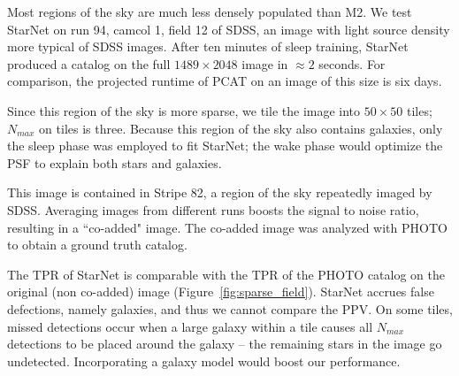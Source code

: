 Most regions of the sky are much less densely populated than M2. 
We test StarNet on run 94, camcol 1, field 12 of SDSS,
an image with light source density more typical of SDSS images.
After ten minutes of sleep training, StarNet produced a catalog on the full $1489\times 2048$ image in $\approx2$ seconds. 
For comparison, the projected runtime of PCAT on an image of this size is six days.  

Since this region of the sky is more sparse, we tile the image into $50\times 50$ tiles; $N_{max}$ on tiles is three. 
Because this region of the sky also contains galaxies, only the sleep phase was employed to fit StarNet; 
the wake phase would optimize the PSF to explain both stars and galaxies. 

This image is contained in Stripe 82, a region of the sky repeatedly imaged by SDSS. Averaging images from different runs boosts the signal to noise ratio, resulting in a ``co-added" image. 
The co-added image was analyzed with PHOTO to obtain a ground truth catalog. 

The TPR of StarNet is comparable with the TPR of the PHOTO catalog on the original (non co-added) image (Figure~\ref{fig:sparse_field}). 
StarNet accrues false defections, namely galaxies, and thus we cannot compare the PPV. 
On some tiles, missed detections occur when a large galaxy within a tile causes all $N_{max}$ detections to be placed around the galaxy -- the remaining stars in the image go undetected. 
Incorporating a galaxy model would boost our performance. 


